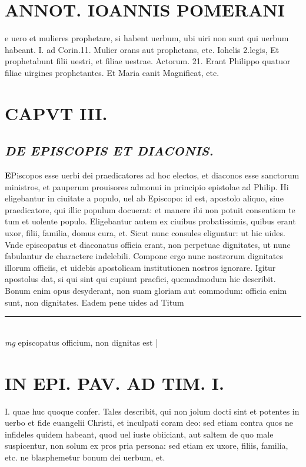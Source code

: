 \documentclass{article}
\begin{document}
\begin{pages}
\section*{ANNOT. IOANNIS POMERANI }\pstart e uero et mulieres prophetare, si habent uerbum, ubi uiri non sunt qui uerbum habeant. I. ad Corin.11. Mulier orans aut prophetans, etc. Iohelis 2.legis, Et prophetabunt filii uestri, et filiae uestrae. Actorum. 21. Erant Philippo quatuor filiae uirgines prophetantes. Et Maria canit Magnificat, etc.  \pend
\endnumbering\beginnumbering\section{CAPVT III.}
{}
\subsection*{\textit{DE EPISCOPIS ET DIACONIS. }}\pstart \huge\textbf{E}\normalsize Piscopos esse uerbi dei praedicatores ad hoc electos, et diaconos esse sanctorum ministros, et pauperum prouisores admonui in principio epistolae ad Philip. Hi eligebantur in ciuitate a populo, uel ab Episcopo: id est, apostolo aliquo, siue praedicatore, qui illic populum docuerat: et manere ibi non potuit consentiem te tum et uolente populo. Eligebantur autem ex ciuibus probatissimis, quibus erant uxor, filii, familia, domus cura, et. Sicut nunc consules eliguntur: ut hic uides. Vnde episcopatus et diaconatus officia erant, non perpetuae dignitates, ut nunc fabulantur de charactere indelebili. Compone ergo nunc nostrorum dignitates illorum officiis, et uidebis apostolicam institutionen nostros ignorare. Igitur apostolus dat, si qui sint qui cupiunt praefici, quemadmodum hic describit. Bonum enim opus desyderant, non suam gloriam aut commodum: officia enim sunt, non dignitates. Eadem pene uides ad Titum  \pend
\vspace{0.5cm}\noindent
\vspace{0.2cm}\rule{1cm}{0.2pt}\\ 
\hspace{0.2cm}\textit{mg}
\footnotesize episcopatus officium, non dignitas est 
\normalsize| 
\section*{IN EPI. PAV. AD TIM. I. }\pstart I. quae huc quoque confer. Tales describit, qui non jolum docti sint et potentes in uerbo et fide euangelii Christi, et inculpati coram deo: sed etiam contra quos ne infideles quidem habeant, quod uel iuste obiiciant, aut saltem de quo male suspicentur, non solum ex pros pria persona: sed etiam ex uxore, filiis, familia, etc. ne blasphemetur bonum dei uerbum, et.  \pend
{}
{}

\end{pages}
\end{document}
